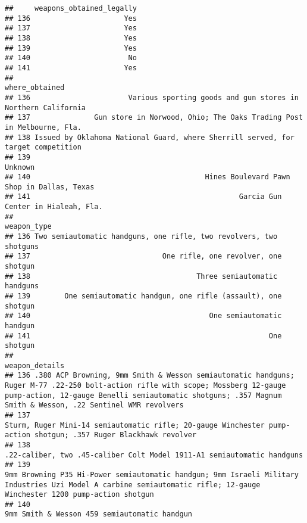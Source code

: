 \documentclass[
]{article}
\begin{document}
\begin{verbatim}
##     weapons_obtained_legally
## 136                      Yes
## 137                      Yes
## 138                      Yes
## 139                      Yes
## 140                       No
## 141                      Yes
##                                                                         where_obtained
## 136                       Various sporting goods and gun stores in Northern California
## 137               Gun store in Norwood, Ohio; The Oaks Trading Post in Melbourne, Fla.
## 138 Issued by Oklahoma National Guard, where Sherrill served, for target competition  
## 139                                                                            Unknown
## 140                                         Hines Boulevard Pawn Shop in Dallas, Texas
## 141                                                 Garcia Gun Center in Hialeah, Fla.
##                                                            weapon_type
## 136 Two semiautomatic handguns, one rifle, two revolvers, two shotguns
## 137                               One rifle, one revolver, one shotgun
## 138                                       Three semiautomatic handguns
## 139        One semiautomatic handgun, one rifle (assault), one shotgun
## 140                                          One semiautomatic handgun
## 141                                                        One shotgun
##                                                                                                                                                                                                                                    weapon_details
## 136 .380 ACP Browning, 9mm Smith & Wesson semiautomatic handguns; Ruger M-77 .22-250 bolt-action rifle with scope; Mossberg 12-gauge pump-action, 12-gauge Benelli semiautomatic shotguns; .357 Magnum Smith & Wesson, .22 Sentinel WMR revolvers
## 137                                                                                                                              Sturm, Ruger Mini-14 semiautomatic rifle; 20-gauge Winchester pump-action shotgun; .357 Ruger Blackhawk revolver
## 138                                                                                                                                                                        .22-caliber, two .45-caliber Colt Model 1911-A1 semiautomatic handguns
## 139                                                                        9mm Browning P35 Hi-Power semiautomatic handgun; 9mm Israeli Military Industries Uzi Model A carbine semiautomatic rifle; 12-gauge Winchester 1200 pump-action shotgun
## 140                                                                                                                                                                                                  9mm Smith & Wesson 459 semiautomatic handgun

\end{verbatim}
\end{document}
